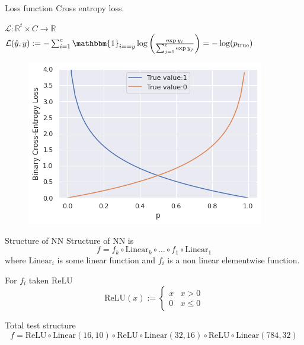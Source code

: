\documentclass{beamer}
\begin{document}
\begin{frame}{Loss function}
	Cross entropy loss.
    
    $\mathcal{L}: \mathbb{R}^t \times C \rightarrow \mathbb{R}$ \\
    $\mathcal{L}(\hat{y}, y) := -\sum_{i=1}^c \mathbbm{1}_{i == y} \log\left(\frac{\exp{y_i}}{\sum_{j=1}^c \exp{y_j}}\right) = -\log(p_{\text{true}})$ \\
    
    \begin{figure}[h]
    	\includegraphics[scale=0.5]{binary-cross-entropy-loss}
    \end{figure}

\end{frame}


\begin{frame}{Structure of NN}
    Structure of NN is 
    $$f = f_k \circ \mathrm{Linear}_k \circ \ldots \circ f_1 \circ \mathrm{Linear}_1$$
    where $\mathrm{Linear}_i$ is some linear function and $f_i$ is a non linear elementwise function.

    For $f_i$ taken $\mathrm{ReLU}$
    $$ 
    \mathrm{ReLU}(x) := \begin{cases}
    x & x > 0 \\
    0 & x \leq 0
    \end{cases} 
    $$
    
    Total test structure
    $$ f = \mathrm{ReLU} \circ \mathrm{Linear}(16, 10) \circ \mathrm{ReLU} \circ \mathrm{Linear}(32, 16) \circ \mathrm{ReLU} \circ \mathrm{Linear}(784, 32)$$

\end{frame}
\end{document}
